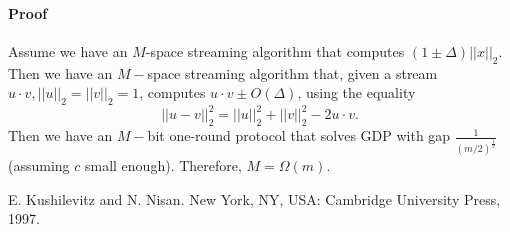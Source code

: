 \documentclass[11pt]{article}
\begin{document}
\paragraph{Proof} 
Assume we have an $M$-space streaming algorithm that computes $(1\pm \Delta)||x||_2$. Then we have an $M-$space streaming algorithm that, given a stream $u \cdot v, ||u||_2=||v||_2=1$, computes $u \cdot v \pm O(\Delta)$, using the equality $$||u-v||_2^2=||u||_2^2+||v||_2^2-2u \cdot v.$$ Then we have an $M-$bit one-round protocol that solves GDP with gap $\frac{1}{(m/2)^{\frac{1}{2}}}$ (assuming $c$ small enough). Therefore, $M= \Omega(m)$.





\begin{thebibliography}{42}
E. Kushilevitz and N. Nisan. 
 \newblock New York, NY, USA: Cambridge University Press, 1997.

\end{thebibliography}
\end{document}
